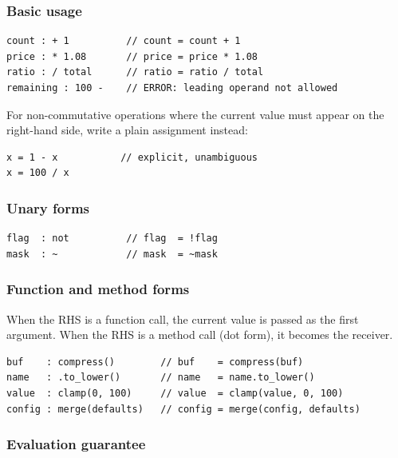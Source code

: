 \subsubsection*{Basic usage}

\begin{lstlisting}[style=zinc, caption={Update operator --- arithmetic}]
count : + 1          // count = count + 1
price : * 1.08       // price = price * 1.08
ratio : / total      // ratio = ratio / total
remaining : 100 -    // ERROR: leading operand not allowed
\end{lstlisting}

For non-commutative operations where the current value must appear on the
right-hand side, write a plain assignment instead:

\begin{lstlisting}[style=zinc, caption={Non-commutative case --- use plain assignment}]
x = 1 - x           // explicit, unambiguous
x = 100 / x
\end{lstlisting}

\subsubsection*{Unary forms}

\begin{lstlisting}[style=zinc, caption={Update operator --- unary}]
flag  : not          // flag  = !flag
mask  : ~            // mask  = ~mask
\end{lstlisting}

\subsubsection*{Function and method forms}

When the RHS is a function call, the current value is passed as the first
argument. When the RHS is a method call (dot form), it becomes the receiver.

\begin{lstlisting}[style=zinc, caption={Update operator --- calls}]
buf    : compress()        // buf    = compress(buf)
name   : .to_lower()       // name   = name.to_lower()
value  : clamp(0, 100)     // value  = clamp(value, 0, 100)
config : merge(defaults)   // config = merge(config, defaults)
\end{lstlisting}

\subsubsection*{Evaluation guarantee}

